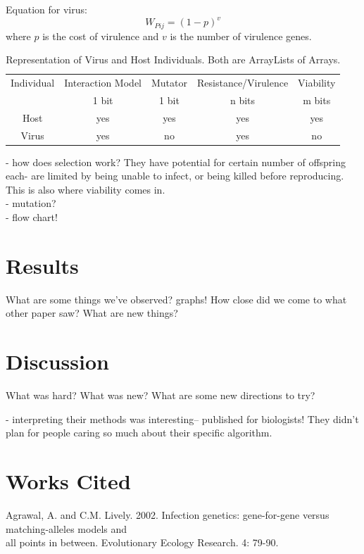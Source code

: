 \documentclass[11pt, oneside]{article}
\begin{document}
Equation for virus:
\begin{equation}
W_{Pij} = (1-p)^v
\end{equation}
where $p$ is the cost of virulence and $v$ is the number of virulence genes.

\begin{table}[H]
	\begin{center}
	 \begin{tabular}{||c c c c c||} 
	 \hline
	Individual & Interaction Model & Mutator & Resistance/Virulence & Viability\\ 
	& 1 bit & 1 bit & n bits & m bits\\
	 \hline\hline
 	Host & yes & yes & yes & yes\\
	 \hline
 	Virus & yes & no & yes & no\\
	 \hline
	\end{tabular}
	\caption{Representation of Virus and Host Individuals. Both are ArrayLists of Arrays.}
	\label{table:1}
	\end{center}
\end{table}

- how does selection work? They have potential for certain number of offspring each- are limited by being unable to infect, or being killed before reproducing. This is also where viability comes in.
\\- mutation?
\\- flow chart!

\section{Results}
What are some things we've observed? graphs! How close did we come to what other paper saw? What are new things?

\section{Discussion}
What was hard? What was new? What are some new directions to try?

- interpreting their methods was interesting-- published for biologists! They didn't plan for people caring so much about their specific algorithm. 

\section{Works Cited}
Agrawal, A. and C.M. Lively. 2002. Infection genetics: gene-for-gene versus matching-alleles models and \\\-\hspace{0.75cm} all points in between. Evolutionary Ecology Research. 4: 79-90.
\end{document}
